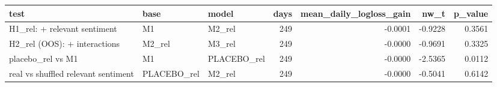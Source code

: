\begin{tabular}{lllrrrr}
\toprule
test & base & model & days & mean\_daily\_logloss\_gain & nw\_t & p\_value \\
\midrule
H1\_rel: + relevant sentiment & M1 & M2\_rel & 249 & -0.0001 & -0.9228 & 0.3561 \\
H2\_rel (OOS): + interactions & M2\_rel & M3\_rel & 249 & -0.0000 & -0.9691 & 0.3325 \\
placebo\_rel vs M1 & M1 & PLACEBO\_rel & 249 & -0.0000 & -2.5365 & 0.0112 \\
real vs shuffled relevant sentiment & PLACEBO\_rel & M2\_rel & 249 & -0.0000 & -0.5041 & 0.6142 \\
\bottomrule
\end{tabular}
